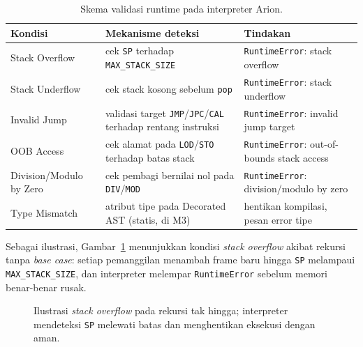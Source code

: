 \documentclass[11pt,a4paper]{article}
\begin{document}
\begin{table}[H]
\centering
\footnotesize
\begin{tabularx}{\textwidth}{l X X}
\toprule
\textbf{Kondisi} & \textbf{Mekanisme deteksi} & \textbf{Tindakan} \\
\midrule
Stack Overflow  & cek \texttt{SP} terhadap \texttt{MAX\_STACK\_SIZE} & \texttt{RuntimeError}: stack overflow \\
Stack Underflow & cek stack kosong sebelum \texttt{pop} & \texttt{RuntimeError}: stack underflow \\
Invalid Jump    & validasi target \texttt{JMP}/\texttt{JPC}/\texttt{CAL} terhadap rentang instruksi & \texttt{RuntimeError}: invalid jump target \\
OOB Access      & cek alamat pada \texttt{LOD}/\texttt{STO} terhadap batas stack & \texttt{RuntimeError}: out-of-bounds stack access \\
Division/Modulo by Zero & cek pembagi bernilai nol pada \texttt{DIV}/\texttt{MOD} & \texttt{RuntimeError}: division/modulo by zero \\
Type Mismatch   & atribut tipe pada Decorated AST (statis, di M3) & hentikan kompilasi, pesan error tipe \\
\bottomrule
\end{tabularx}
\caption{Skema validasi runtime pada interpreter Arion.}
\label{tab:runtime}
\end{table}

Sebagai ilustrasi, Gambar~\ref{fig:overflow} menunjukkan kondisi
\textit{stack overflow} akibat rekursi tanpa \textit{base case}: setiap
pemanggilan menambah frame baru hingga \texttt{SP} melampaui
\texttt{MAX\_STACK\_SIZE}, dan interpreter melempar \texttt{RuntimeError}
sebelum memori benar-benar rusak.

\begin{figure}[H]
\centering
{}
\caption{Ilustrasi \textit{stack overflow} pada rekursi tak hingga; interpreter
mendeteksi \texttt{SP} melewati batas dan menghentikan eksekusi dengan aman.}
\label{fig:overflow}
\end{figure}
\end{document}

